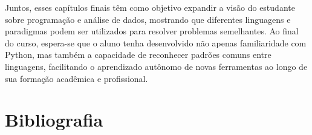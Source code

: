 \documentclass[
  brazilian,
  letterpaper,
  DIV=11,
  numbers=noendperiod]{scrreprt}
\begin{document}
Juntos, esses capítulos finais têm como objetivo expandir a visão do
estudante sobre programação e análise de dados, mostrando que diferentes
linguagens e paradigmas podem ser utilizados para resolver problemas
semelhantes. Ao final do curso, espera-se que o aluno tenha desenvolvido
não apenas familiaridade com Python, mas também a capacidade de
reconhecer padrões comuns entre linguagens, facilitando o aprendizado
autônomo de novas ferramentas ao longo de sua formação acadêmica e
profissional.


\chapter*{Bibliografia}\label{sec-bibliografia}


\label{refs}
\end{document}
